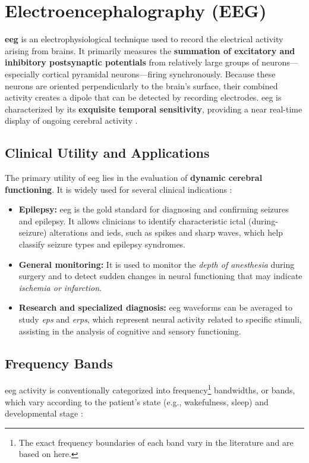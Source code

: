 \section{Electroencephalography (EEG)}\label{sec:eeg-background}

\textbf{\Gls{eeg}} is an electrophysiological technique used to record the electrical activity arising from brains.
It primarily measures the \textbf{summation of excitatory and inhibitory postsynaptic potentials} from relatively large groups of neurons---especially cortical pyramidal neurons---firing synchronously.
Because these neurons are oriented perpendicularly to the brain's surface, their combined activity creates a dipole that can be detected by recording electrodes.
\gls{eeg} is characterized by its \textbf{exquisite temporal sensitivity}, providing a near real-time display of ongoing cerebral activity \parencite{st_louis_electroencephalography_2016}.

\subsection{Clinical Utility and Applications}
The primary utility of \gls{eeg} lies in the evaluation of \textbf{dynamic cerebral functioning}. 
It is widely used for several clinical indications \parencite{st_louis_electroencephalography_2016}:
\begin{itemize}
    \item \textbf{Epilepsy:} \gls{eeg} is the gold standard for diagnosing and confirming seizures and epilepsy. 
    It allows clinicians to identify characteristic ictal (during-seizure) alterations and \glspl{ied}, such as spikes and sharp waves, which help classify seizure types and epilepsy syndromes.
    \item \textbf{General monitoring:} It is used to monitor the \textit{depth of anesthesia} during surgery and to detect sudden changes in neural functioning that may indicate \textit{ischemia or infarction}.
    \item \textbf{Research and specialized diagnosis:} \gls{eeg} waveforms can be averaged to study \textit{\glspl{ep}} and \textit{\glspl{erp}}, which represent neural activity related to specific stimuli, assisting in the analysis of cognitive and sensory functioning.
\end{itemize}

\subsection{Frequency Bands}
\gls{eeg} activity is conventionally categorized into frequency\footnote{The exact frequency boundaries of each band vary in the literature and are based on \textcite{mormann_seizure_2007} here.} bandwidths, or bands, which vary according to the patient's state (e.g., wakefulness, sleep) and developmental stage \parencite{st_louis_electroencephalography_2016, mormann_seizure_2007, nayak_normal_2026}:

